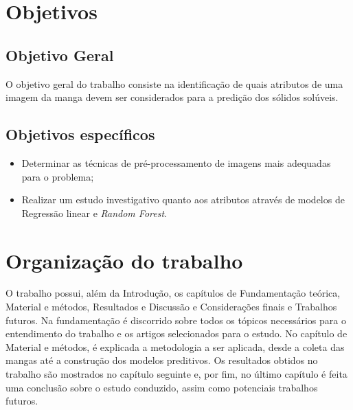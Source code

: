 \section{Objetivos}

\subsection{Objetivo Geral}
O objetivo geral do trabalho consiste na identificação de quais atributos de uma imagem da manga devem ser considerados para a predição dos sólidos solúveis. 

\subsection{Objetivos específicos}

\begin{itemize}
	\item Determinar as técnicas de pré-processamento de imagens mais adequadas para o problema;
    \item Realizar um estudo investigativo quanto aos atributos através de modelos de Regressão linear e \textit{Random Forest}.
\end{itemize}

\section{Organização do trabalho}

O trabalho possui, além da Introdução, os capítulos de Fundamentação teórica, Material e métodos, Resultados e Discussão e Considerações finais e Trabalhos futuros. Na fundamentação é discorrido sobre todos os tópicos necessários para o entendimento do trabalho e os artigos selecionados para o estudo. No capítulo de Material e métodos, é explicada a metodologia a ser aplicada, desde a coleta das mangas até a construção dos modelos preditivos. Os resultados obtidos no trabalho são mostrados no capítulo seguinte e, por fim, no último capítulo é feita uma conclusão sobre o estudo conduzido, assim como potenciais trabalhos futuros.
